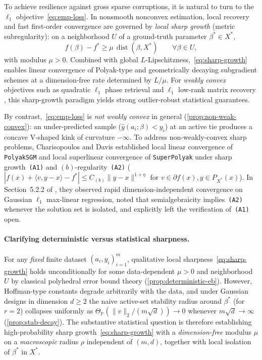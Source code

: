 \documentclass[11pt]{article}
\theoremstyle{plain}
\theoremstyle{remark}
\numberwithin{equation}{section}
\newcommand{\Prob}{\mathbb{P}}
\newcommand{\ip}[2]{\langle #1, #2 \rangle}
\newcommand{\norm}[1]{\|#1\|}
\newcommand{\dist}{\operatorname{dist}}
\begin{document}
To achieve resilience against gross sparse corruptions, it is natural to turn to the $\ell_1$ objective~\eqref{eq:emp-loss}. In nonsmooth nonconvex estimation, local recovery and fast first-order convergence are governed by \emph{local sharp growth} (metric subregularity): on a neighborhood $U$ of a ground-truth parameter $\beta^* \in X^*$,
\begin{equation}
  \label{eq:sharp-growth}
  f(\beta) - f^* \ge \mu\,\dist(\beta, X^*) \qquad \forall \beta \in U,
\end{equation}
with modulus $\mu > 0$. Combined with global $L$-Lipschitzness,~\eqref{eq:sharp-growth} enables linear convergence of Polyak-type \cite{polyak1969minimization} and geometrically decaying subgradient schemes \cite{davis2018subgradient,davis2024stochastic} at a dimension-free rate determined by $L/\mu$. For \emph{weakly convex} objectives such as quadratic $\ell_1$ phase retrieval \cite{duchi2019solving,davis2020nonsmooth} and $\ell_1$ low-rank matrix recovery \cite{charisopoulos2021lowrank}, this sharp-growth paradigm yields strong outlier-robust statistical guarantees.

By contrast,~\eqref{eq:emp-loss} is \emph{not weakly convex} in general (\cref{prop:non-weak-convex}): an under-predicted sample ($\hat y(a_i; \beta) < y_i$) at an active tie produces a concave V-shaped kink of curvature $-\infty$. To address non-weakly-convex sharp problems, Charisopoulos and Davis \cite{charisopoulos2024superpolyak} established local linear convergence of \texttt{PolyakSGM} and local superlinear convergence of \texttt{SuperPolyak} under sharp growth~\texttt{(A1)} and $(b)$-regularity~\texttt{(A2)} ($|f(x) + \ip{v}{y - x} - f^*| \le C_{(b)}\norm{y - x}^{1 + \eta}$ for $v \in \partial f(x), y \in P_{X^*}(x)$). In Section~5.2.2 of \cite{charisopoulos2024superpolyak}, they observed rapid dimension-independent convergence on Gaussian $\ell_1$ max-linear regression, noted that semialgebraicity implies~\texttt{(A2)} whenever the solution set is isolated, and explicitly left the verification of~\texttt{(A1)} open.

\paragraph{Clarifying deterministic versus statistical sharpness.}
For any \emph{fixed} finite dataset $(a_i, y_i)_{i=1}^m$, qualitative local sharpness~\eqref{eq:sharp-growth} holds unconditionally for some data-dependent $\mu > 0$ and neighborhood $U$ by classical polyhedral error bound theory \cite{hoffman1952approximate,robinson1981some,gowda1996analysis,pang1997error,dolgopolik2023nonlocal} (\cref{prop:deterministic-eb}). However, Hoffman-type constants degrade arbitrarily with the data, and under Gaussian designs in dimension $d \ge 2$ the naive active-set stability radius around $\beta^*$ (for $r = 2$) collapses uniformly as $\Theta_{\Prob}(\norm{v}_2/(m\sqrt{d})) \to 0$ whenever $m\sqrt{d} \to \infty$ (\cref{prop:stab-decay}). The substantive statistical question is therefore establishing high-probability sharp growth~\eqref{eq:sharp-growth} with a \emph{dimension-free} modulus $\mu$ on a \emph{macroscopic} radius $\rho$ independent of $(m, d)$, together with local isolation of $\beta^*$ in $X^*$.
\end{document}
